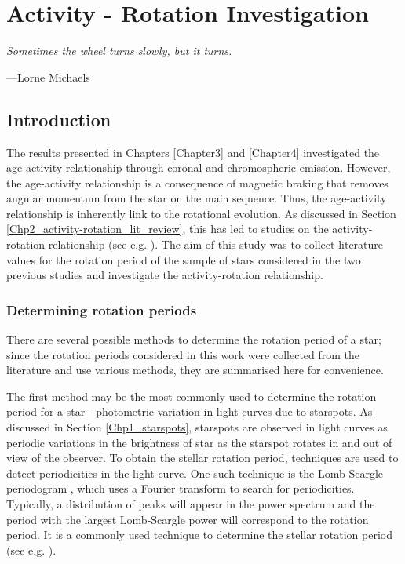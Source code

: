 
\chapter{Activity - Rotation Investigation} %

\label{Chapter5} 

\epigraph{\itshape Sometimes the wheel turns slowly, but it turns.}{---Lorne Michaels}

\section{Introduction}

The results presented in Chapters \ref{Chapter3} and \ref{Chapter4} investigated the age-activity relationship through coronal and chromospheric emission. However, the age-activity relationship is a consequence of magnetic braking that removes angular momentum from the star on the main sequence. Thus, the age-activity relationship is inherently link to the rotational evolution. As discussed in Section \ref{Chp2_activity-rotation_lit_review}, this has led to studies on the activity-rotation relationship (see e.g. \citealt{Pizzolato_etal_2003,Wright_etal_2011}). The aim of this study was to collect literature values for the rotation period of the sample of stars considered in the two previous studies and investigate the activity-rotation relationship.

\subsection{Determining rotation periods}

There are several possible methods to determine the rotation period of a star; since the rotation periods considered in this work were collected from the literature and use various methods, they are summarised here for convenience.

The first method may be the most commonly used to determine the rotation period for a star - photometric variation in light curves due to starspots. As discussed in Section \ref{Chp1_starspots}, starspots are observed in light curves as periodic variations in the brightness of star as the starspot rotates in and out of view of the observer. To obtain the stellar rotation period, techniques are used to detect periodicities in the light curve. One such technique is the Lomb-Scargle periodogram \citep{Lomb_1976,Scargle_1982}, which uses a Fourier transform to search for periodicities. Typically, a distribution of peaks will appear in the power spectrum and the period with the largest Lomb-Scargle power will correspond to the rotation period. It is a commonly used technique to determine the stellar rotation period (see e.g. \citealt{do_Nascimento_etal_2014,Nielsen_etal_2013}).

